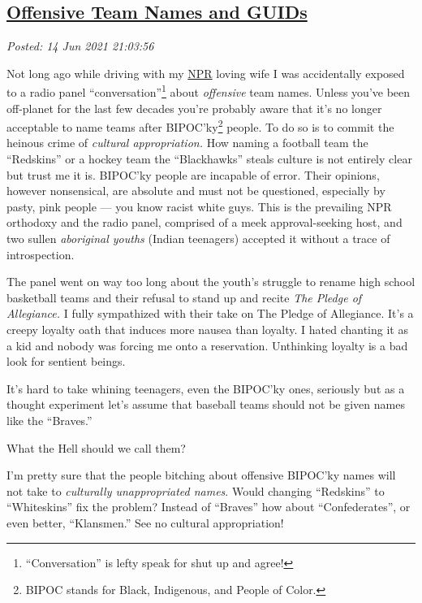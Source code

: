 %

\subsection*{\href{http://analyzethedatanotthedrivel.org/2021/06/14/offensive-team-names-and-guids/}{Offensive Team Names and GUIDs}}


\noindent\emph{Posted: 14 Jun 2021 21:03:56}
\vspace{6pt}

Not long ago while driving with my \href{https://www.npr.org/}{NPR}
loving wife I was accidentally exposed to a radio panel
``conversation''\footnote{``Conversation'' is lefty speak for shut up and agree!
} about
\emph{offensive} team names. Unless you've been off-planet for the last
few decades you're probably aware that it's no longer acceptable to name
teams after BIPOC'ky\footnote{BIPOC stands for Black, Indigenous, and People of Color.
} people.
To do so is to commit the heinous crime of \emph{cultural
appropriation.} How naming a football team the ``Redskins'' or a hockey
team the ``Blackhawks'' steals culture is not entirely clear but trust
me it is. BIPOC'ky people are incapable of error. Their opinions,
however nonsensical, are absolute and must not be questioned, especially
by pasty, pink people --- you know racist white guys. This is the
prevailing NPR orthodoxy and the radio panel, comprised of a meek
approval-seeking host, and two sullen \emph{aboriginal youths} (Indian
teenagers) accepted it without a trace of introspection.

The panel went on way too long about the youth's struggle to rename high
school basketball teams and their refusal to stand up and recite
\emph{The Pledge of Allegiance.} I fully sympathized with their take on
The Pledge of Allegiance. It's a creepy loyalty oath that induces more
nausea than loyalty. I hated chanting it as a kid and nobody was forcing
me onto a reservation. Unthinking loyalty is a bad look for sentient
beings.

It's hard to take whining teenagers, even the BIPOC'ky ones, seriously
but as a thought experiment let's assume that baseball teams should not
be given names like the ``Braves.''

What the Hell should we call them?

I'm pretty sure that the people bitching about offensive BIPOC'ky names
will not take to \emph{culturally unappropriated names}. Would changing
``Redskins'' to ``Whiteskins'' fix the problem? Instead of ``Braves''
how about ``Confederates'', or even better, ``Klansmen.'' See no
cultural appropriation!

